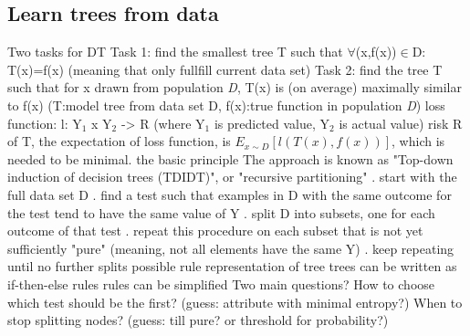 \subsection{Learn trees from data}
\begin{outline}
    \1 Two tasks for DT
        \2 Task 1: find the smallest tree T such that $\forall$(x,f(x))$\in$D: T(x)=f(x) (meaning that only fullfill current data set)
        \2 Task 2: find the tree T such that for x drawn from population \emph{D}, T(x) is (on average) maximally similar to f(x) (T:model tree from data set D, f(x):true function in population \emph{D})
            \3 loss function: l: Y$_{1}$ x Y$_{2}$ -> R (where Y$_{1}$ is predicted value, Y$_{2}$ is actual value)
            \3 risk R of T, the expectation of loss function, is $E_{x{\sim}D}[l(T(x),f(x))]$, which is needed to be minimal.
    \1 the basic principle
        \2 The approach is known as "Top-down induction of decision trees (TDIDT)", or "recursive partitioning"
            . start with the full data set D
            . find a test such that examples in D with the same outcome for the test tend to have the same value of Y
            . split D into subsets, one for each outcome of that test
            . repeat this procedure on each subset that is not yet sufficiently "pure" (meaning, not all elements have the same Y)
            . keep repeating until no further splits possible
    \1 rule representation of tree
        \2 trees can be written as if-then-else rules
        \2 rules can be simplified
    \1 Two main questions?
        \2 How to choose which test should be the first? (guess: attribute with minimal entropy?)
        \2 When to stop splitting nodes? (guess: till pure? or threshold for probability?)
\end{outline}

